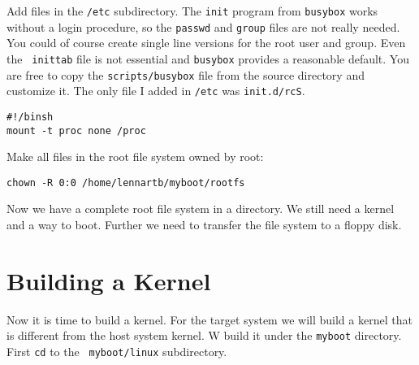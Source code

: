\documentclass[12pt,a4paper]{article}
\begin{document}
Add files in the {\tt /etc} subdirectory. The {\tt init} program from
{\tt busybox} works without a login procedure, so the {\tt passwd} and
{\tt group} files are not really needed. You could of course create
single line versions for the root user and group. Even the {\tt
  inittab} file is not essential and {\tt busybox} provides a
reasonable default. You are free to copy the {\tt scripts/busybox}
file from the source directory and customize it.
The only file I added in {\tt /etc} was {\tt init.d/rcS}.
\begin{verbatim}
#!/binsh
mount -t proc none /proc
\end{verbatim}

Make all files in the root file system owned by root:
\begin{verbatim}
chown -R 0:0 /home/lennartb/myboot/rootfs
\end{verbatim}

Now we have a complete root file system in a directory. We still need
a kernel and a way to boot. Further we need to transfer the file
system to a floppy disk.

\section{Building a Kernel}

Now it is time to build a kernel. For the target system we will build
a kernel that is different from the host system kernel. W build it
under the {\tt myboot} directory. First {\tt cd} to the {\tt
  myboot/linux} subdirectory.
\end{document}
